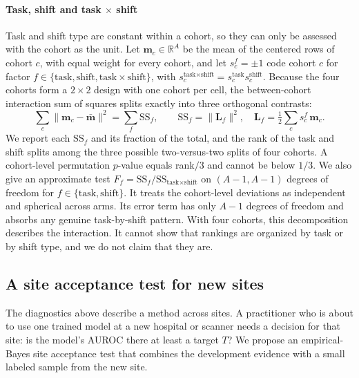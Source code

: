 \paragraph{Task, shift and task $\times$ shift} Task and shift type are
constant within a cohort, so they can only be assessed with the cohort as the
unit. Let $\mathbf m_c\in\mathbb R^A$ be the mean of the centered rows of
cohort $c$, with equal weight for every cohort, and let $s^{f}_c=\pm1$ code
cohort $c$ for factor
$f\in\{\text{task},\text{shift},\text{task}\times\text{shift}\}$, with
$s^{\text{task}\times\text{shift}}_c=s^{\text{task}}_c s^{\text{shift}}_c$.
Because the four cohorts form a $2\times2$ design with one cohort per cell, the
between-cohort interaction sum of squares splits exactly into three orthogonal
contrasts:
\begin{equation}
  \sum_{c}\|\mathbf m_c-\bar{\mathbf m}\|^2
  =\sum_{f}\mathrm{SS}_f,\qquad
  \mathrm{SS}_f=\|\mathbf L_f\|^2,\quad
  \mathbf L_f=\tfrac12\sum_c s^{f}_c\,\mathbf m_c .
  \label{eq:2x2}
\end{equation}
We report each $\mathrm{SS}_f$ and its fraction of the total, and the rank
of the task and shift splits among the three possible two-versus-two splits of
four cohorts. A cohort-level permutation $p$-value equals rank$/3$ and cannot
be below $1/3$. We also give an approximate test $F_f=\mathrm{SS}_f/\mathrm{SS}_{\text{task}\times\text{shift}}$
on $(A-1,A-1)$ degrees of freedom for $f\in\{\text{task},\text{shift}\}$. It
treats the cohort-level deviations as independent and spherical across arms.
Its error term has only $A-1$ degrees of freedom and absorbs any genuine
task-by-shift pattern. With four cohorts, this decomposition describes the
interaction. It cannot show that rankings are organized by task or by shift
type, and we do not claim that they are.

\subsection{A site acceptance test for new sites}
\label{sec:sat}

The diagnostics above describe a method across sites. A practitioner who is
about to use one trained model at a new hospital or scanner needs a decision
for that site: is the model's AUROC there at least a target $T$? We propose an
empirical-Bayes site acceptance test that combines the development evidence
with a small labeled sample from the new site.

